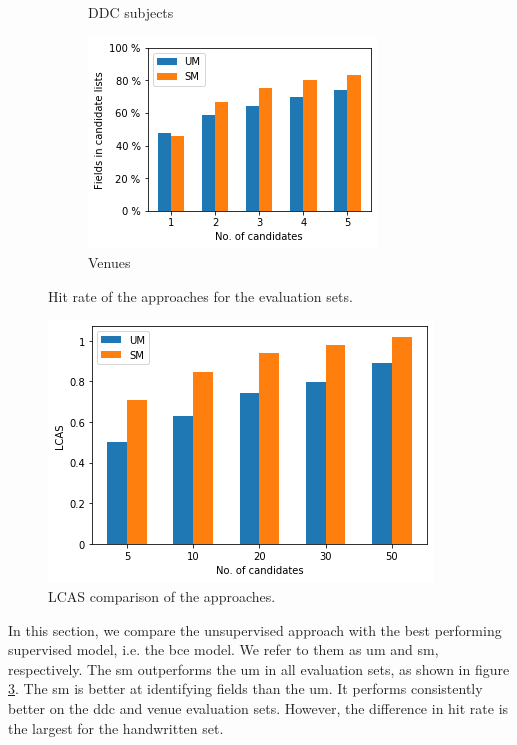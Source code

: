 \begin{figure}
\begin{subfigure}[t]{.32\textwidth}
    \caption{DDC subjects}
    \label{fig:compare_ddc}
  \end{subfigure}
   \begin{subfigure}[t]{.32\textwidth}
    \centering
    \includegraphics[width=\textwidth]{figures/supervised_approach/compare_venue.png}
    \caption{Venues}
    \label{fig:compare_venue}
  \end{subfigure}
  \caption{Hit rate of the approaches for the evaluation sets.}
  \label{fig:compare_eval}
\end{figure}

\begin{figure}
    \centering
    \includegraphics[width=.6\textwidth]{figures/evaluation/compare_lcas.png}
    \caption{LCAS comparison of the approaches.}
    \label{fig:compare_lcas}
\end{figure}

In this section, we compare the unsupervised approach with the best performing supervised model, i.e. the \acrshort{bce} model. We refer to them as \acrfull{um} and \acrfull{sm}, respectively. The \acrshort{sm} outperforms the \acrshort{um} in all evaluation sets, as shown in figure \ref{fig:compare_eval}. The \acrshort{sm} is better at identifying fields than the \acrshort{um}. It performs consistently better on the \acrshort{ddc} and venue evaluation sets. However, the difference in hit rate is the largest for the handwritten set.


